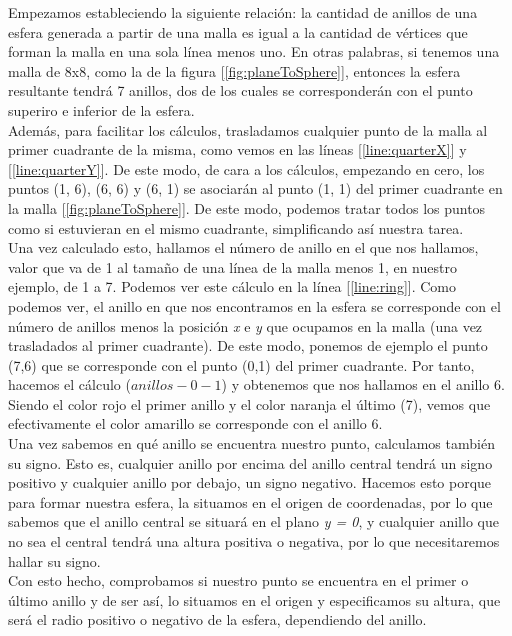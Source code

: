Empezamos estableciendo la siguiente relación: la cantidad de anillos de una esfera generada a partir de una malla es igual a la cantidad de vértices que forman la malla en una sola línea menos uno. En otras palabras, si tenemos una malla de 8x8, como la de la figura [\ref{fig:planeToSphere}], entonces la esfera resultante tendrá 7 anillos, dos de los cuales se corresponderán con el punto superiro e inferior de la esfera.\\

Además, para facilitar los cálculos, trasladamos cualquier punto de la malla al primer cuadrante de la misma, como vemos en las líneas [\ref{line:quarterX}] y [\ref{line:quarterY}]. De este modo, de cara a los cálculos, empezando en cero, los puntos (1, 6), (6, 6) y (6, 1) se asociarán al punto (1, 1) del primer cuadrante en la malla [\ref{fig:planeToSphere}]. De este modo, podemos tratar todos los puntos como si estuvieran en el mismo cuadrante, simplificando así nuestra tarea.\\

Una vez calculado esto, hallamos el número de anillo en el que nos hallamos, valor que va de 1 al tamaño de una línea de la malla menos 1, en nuestro ejemplo, de 1 a 7. Podemos ver este cálculo en la línea [\ref{line:ring}]. Como podemos ver, el anillo en que nos encontramos en la esfera se corresponde con el número de anillos menos la posición \emph{x} e \emph{y} que ocupamos en la malla (una vez trasladados al primer cuadrante). De este modo, ponemos de ejemplo el punto (7,6) que se corresponde con el punto (0,1) del primer cuadrante. Por tanto, hacemos el cálculo (\(anillos - 0 - 1\)) y obtenemos que nos hallamos en el anillo 6. Siendo el color rojo el primer anillo y el color naranja el último (7), vemos que efectivamente el color amarillo se corresponde con el anillo 6.\\

Una vez sabemos en qué anillo se encuentra nuestro punto, calculamos también su signo. Esto es, cualquier anillo por encima del anillo central tendrá un signo positivo y cualquier anillo por debajo, un signo negativo. Hacemos esto porque para formar nuestra esfera, la situamos en el origen de coordenadas, por lo que sabemos que el anillo central se situará en el plano \emph{y = 0}, y cualquier anillo que no sea el central tendrá una altura positiva o negativa, por lo que necesitaremos hallar su signo.\\

Con esto hecho, comprobamos si nuestro punto se encuentra en el primer o último anillo y de ser así, lo situamos en el origen y especificamos su altura, que será el radio positivo o negativo de la esfera, dependiendo del anillo.\\

